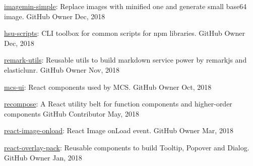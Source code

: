 \begin{cvhonors}


  \cvhonor
    {\href{https://github.com/evenchange4/imagemin-simple}{imagemin-simple}: \textmd{Replace images with minified one and generate small base64 image.}} %
    {GitHub} %
    {Owner} %
    {Dec, 2018} %

  \cvhonor
    {\href{https://github.com/evenchange4/hsu-scripts}{hsu-scripts}: \textmd{CLI toolbox for common scripts for npm libraries.}} %
    {GitHub} %
    {Owner} %
    {Dec, 2018} %

  \cvhonor
    {\href{https://github.com/evenchange4/remark-utils}{remark-utils}: \textmd{Reusable utils to build markdown service power by remarkjs and elasticlunr.}} %
    {GitHub} %
    {Owner} %
    {Nov, 2018} %

  \cvhonor
    {\href{https://github.com/Mediatek-Cloud/mcs-ui}{mcs-ui}: \textmd{React components used by MCS.}} %
    {GitHub} %
    {Owner} %
    {Oct, 2018} %

  \cvhonor
    {\href{https://github.com/acdlite/recompose}{recompose}: \textmd{A React utility belt for function components and higher-order components}} %
    {GitHub} %
    {Contributor} %
    {May, 2018} %

  \cvhonor
    {\href{https://github.com/evenchange4/react-image-onload}{react-image-onload}: \textmd{React Image onLoad event.}} %
    {GitHub} %
    {Owner} %
    {Mar, 2018} %

  \cvhonor
    {\href{https://github.com/evenchange4/react-overlay-pack}{react-overlay-pack}: \textmd{Reusable components to build Tooltip, Popover and Dialog.}} %
    {GitHub} %
    {Owner} %
    {Jan, 2018} %


\end{cvhonors}
